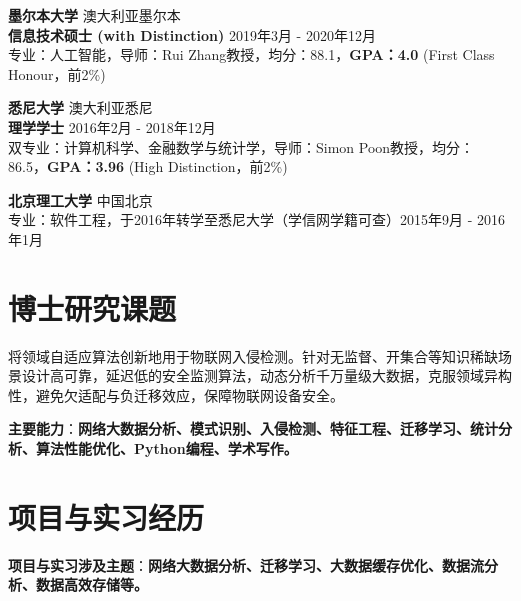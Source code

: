 \documentclass[UTF8,letterpaper,11pt]{article}
\begin{document}
\vspace{10pt}

\textbf{墨尔本大学} \hfill 澳大利亚墨尔本\\
\textbf{信息技术硕士 (with Distinction)} \hfill 2019年3月 - 2020年12月\\
专业：人工智能，导师：Rui Zhang教授，均分：88.1，\textbf{GPA：4.0} (First Class Honour，前2\%)

\vspace{10pt}

\textbf{悉尼大学} \hfill 澳大利亚悉尼\\
\textbf{理学学士} \hfill 2016年2月 - 2018年12月\\
双专业：计算机科学、金融数学与统计学，导师：Simon Poon教授，均分：86.5，\textbf{GPA：3.96} (High Distinction，前2\%)

\vspace{10pt}

\textbf{北京理工大学} \hfill 中国北京\\
专业：软件工程，于2016年转学至悉尼大学（学信网学籍可查）\hfill 2015年9月 - 2016年1月\\

\vspace{1pt}




\section{\textbf{博士研究课题}}

将领域自适应算法创新地用于物联网入侵检测。针对无监督、开集合等知识稀缺场景设计高可靠，延迟低的安全监测算法，动态分析千万量级大数据，克服领域异构性，避免欠适配与负迁移效应，保障物联网设备安全。

\vspace{2mm}

\textbf{主要能力}：\textbf{网络大数据分析、模式识别、入侵检测、特征工程、迁移学习、统计分析、算法性能优化、Python编程、学术写作。}

\vspace{1pt}




\section{\textbf{项目与实习经历}}

\textbf{项目与实习涉及主题}：\textbf{网络大数据分析、迁移学习、大数据缓存优化、数据流分析、数据高效存储等。}
\end{document}
